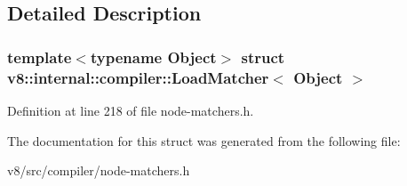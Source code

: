 \subsection{Detailed Description}
\subsubsection*{template$<$typename Object$>$\newline
struct v8\+::internal\+::compiler\+::\+Load\+Matcher$<$ Object $>$}



Definition at line 218 of file node-\/matchers.\+h.



The documentation for this struct was generated from the following file\+:\begin{DoxyCompactItemize}
\item 
v8/src/compiler/node-\/matchers.\+h\end{DoxyCompactItemize}
